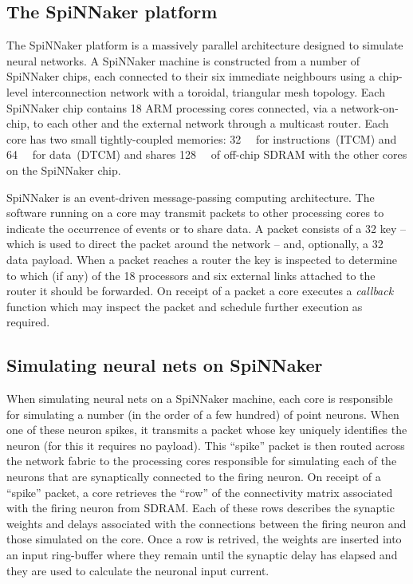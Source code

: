\documentclass[conference]{IEEEtran}
\begin{document}
  \subsection{The SpiNNaker platform}
  The SpiNNaker platform is a massively parallel architecture designed to 
  simulate neural networks. A SpiNNaker machine is constructed from a number 
  of SpiNNaker chips, each connected to their six immediate neighbours using a 
  chip-level interconnection network with a toroidal, triangular mesh 
  topology. Each SpiNNaker chip contains 18 ARM processing cores connected, via 
  a network-on-chip, to each other and the external network through a 
  multicast router. Each core has two small tightly-coupled memories: 
  \SI{32}{\kibi\byte} for instructions~(ITCM) and \SI{64}{\kibi\byte} for 
  data~(DTCM) and shares \SI{128}{\mebi\byte} of off-chip SDRAM with the other 
  cores on the SpiNNaker chip.

  SpiNNaker is an event-driven message-passing computing architecture. The
  software running on a core may transmit packets to other processing cores to
  indicate the occurrence of events or to share data. A packet consists of a
  \SI{32}{\bit} key -- which is used to direct the packet around the network --
  and, optionally, a \SI{32}{\bit} data payload. When a packet reaches a
  router the key is inspected to determine to which (if any) of the 18
  processors and six external links attached to the router it should be
  forwarded. On receipt of a packet a core executes a \textit{callback}
  function which may inspect the packet and schedule further execution as
  required.

  \subsection{Simulating neural nets on SpiNNaker}

  When simulating neural nets on a SpiNNaker machine, each core is responsible
  for simulating a number (in the order of a few hundred) of point neurons. 
  When one of these neuron spikes, it transmits a packet whose key uniquely 
  identifies the neuron (for this it requires no payload). This ``spike'' 
  packet is then routed across the network fabric to the processing cores 
  responsible for simulating each of the neurons that are synaptically 
  connected to the firing neuron. On receipt of a ``spike'' packet, a core 
  retrieves the ``row'' of the connectivity matrix associated with the firing 
  neuron from SDRAM. Each of these rows describes the synaptic weights and 
  delays associated with the connections between the firing neuron and those 
  simulated on the core. Once a row is retrived, the weights are inserted into 
  an input ring-buffer where they remain until the synaptic delay has elapsed 
  and they are used to calculate the neuronal input current.
\end{document}
